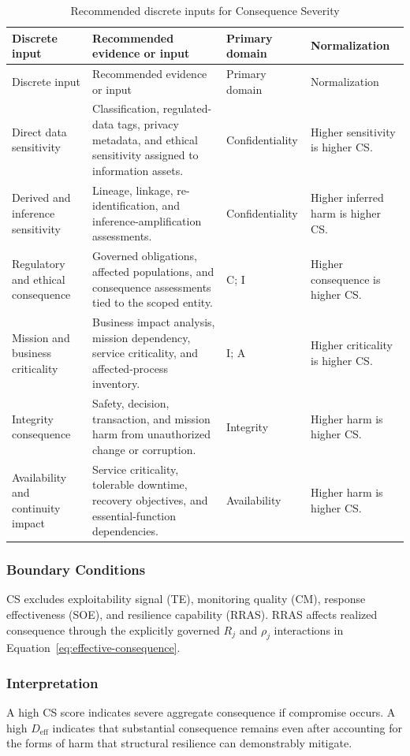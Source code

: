 \documentclass[11pt]{article}
\begin{document}
\begin{longtable}{P{0.18\textwidth} P{0.35\textwidth} P{0.18\textwidth} P{0.17\textwidth}}
  \caption{Recommended discrete inputs for Consequence Severity}\\
  \toprule
  Discrete input & Recommended evidence or input & Primary domain & Normalization \\
  \midrule
  \endfirsthead
  \toprule
  Discrete input & Recommended evidence or input & Primary domain & Normalization \\
  \midrule
  \endhead
  Direct data sensitivity & Classification, regulated-data tags, privacy metadata, and ethical sensitivity assigned to information assets. & Confidentiality & Higher sensitivity is higher CS. \\
  Derived and inference sensitivity & Lineage, linkage, re-identification, and inference-amplification assessments. & Confidentiality & Higher inferred harm is higher CS. \\
  Regulatory and ethical consequence & Governed obligations, affected populations, and consequence assessments tied to the scoped entity. & C; I & Higher consequence is higher CS. \\
  Mission and business criticality & Business impact analysis, mission dependency, service criticality, and affected-process inventory. & I; A & Higher criticality is higher CS. \\
  Integrity consequence & Safety, decision, transaction, and mission harm from unauthorized change or corruption. & Integrity & Higher harm is higher CS. \\
  Availability and continuity impact & Service criticality, tolerable downtime, recovery objectives, and essential-function dependencies. & Availability & Higher harm is higher CS. \\
  \bottomrule
\end{longtable}

\subsubsection{Boundary Conditions}
CS excludes exploitability signal (TE), monitoring quality (CM), response effectiveness
(SOE), and resilience capability (RRAS). RRAS affects realized consequence through
the explicitly governed $R_j$ and $\rho_j$ interactions in
Equation~\ref{eq:effective-consequence}.

\subsubsection{Interpretation}
A high CS score indicates severe aggregate consequence if compromise occurs. A high
$D_{\mathrm{eff}}$ indicates that substantial consequence remains even after accounting
for the forms of harm that structural resilience can demonstrably mitigate.
\end{document}
